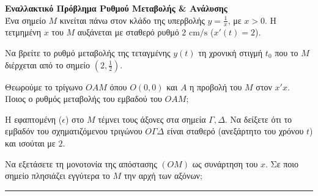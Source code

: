 \documentclass[11pt,a4paper]{article}
\newcommand{\kerkissans}[1]{{\fontfamily{maksf}\selectfont \textbf{#1}}}
\newcounter{themaD}
\newcommand{\ThemaD}{\refstepcounter{themaD}{\textbf{\textcolor{black}{\faPenSquare\ \ \large \kerkissans{\textbf{Θέμα Δ\arabic{themaD}}}}}}\hspace{2mm}}
\newenvironment{themaDbox}
{\begin{tcolorbox}[title=\ThemaD,breakable,
enhanced standard,titlerule=0pt,toprule=0pt, rightrule=0pt, bottomrule=0pt,
colback=white,left=0mm,top=1mm,bottom=0mm,
boxrule=0pt,
colframe=white,leftrule=0mm,sharp corners,coltitle=black]}
{\end{tcolorbox}\vspace{0.7cm}\hrule\vspace{0.7cm}}
\begin{document}
\begin{themaDbox}
\textbf{Εναλλακτικό Πρόβλημα Ρυθμού Μεταβολής \& Ανάλυσης}\\
Ένα σημείο $M$ κινείται πάνω στον κλάδο της υπερβολής $y = \frac{1}{x}$, με $x>0$. Η τετμημένη $x$ του $M$ αυξάνεται με σταθερό ρυθμό $2 \text{ cm/s}$ ($x'(t) = 2$). 
\begin{erwthma}
    \item Να βρείτε το ρυθμό μεταβολής της τεταγμένης $y(t)$ τη χρονική στιγμή $t_0$ που το $M$ διέρχεται από το σημείο $\left(2, \frac{1}{2}\right)$.
    \item Θεωρούμε το τρίγωνο $OAM$ όπου $O(0,0)$ και $A$ η προβολή του $M$ στον $x'x$. Ποιος ο ρυθμός μεταβολής του εμβαδού του $OAM$;
    \item Η εφαπτομένη ($\epsilon$) στο $M$ τέμνει τους άξονες στα σημεία $\Gamma, \Delta$. Να δείξετε ότι το εμβαδόν του σχηματιζόμενου τριγώνου $O\Gamma\Delta$ είναι σταθερό (ανεξάρτητο του χρόνου $t$) και ισούται με $2$.
    \item Να εξετάσετε τη μονοτονία της απόστασης $(OM)$ ως συνάρτηση του $x$. Σε ποιο σημείο πλησιάζει εγγύτερα το $M$ την αρχή των αξόνων;
\end{erwthma}
\end{themaDbox}
\end{document}
